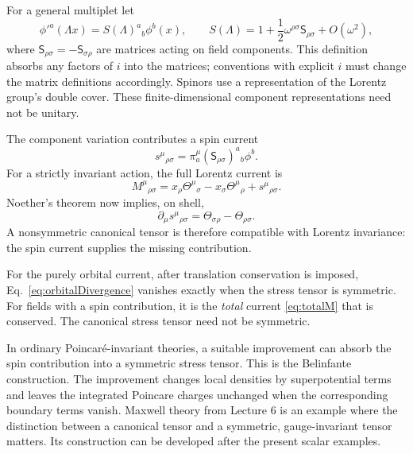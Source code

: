 \documentclass[11pt]{article}
\newcommand{\Th}{\Theta}
\begin{document}
For a general multiplet let
\begin{equation}
\phi'^a(\Lambda x)=S(\Lambda)^a{}_b\phi^b(x),\qquad
S(\Lambda)=1+\frac12\omega^{\rho\sigma}\mathsf S_{\rho\sigma}
+O(\omega^2),
\label{eq:LorentzRepresentation}
\end{equation}
where \(\mathsf S_{\rho\sigma}=-\mathsf S_{\sigma\rho}\) are matrices
acting on field components. This definition absorbs any factors of \(i\)
into the matrices; conventions with explicit \(i\) must change the
matrix definitions accordingly. Spinors use a representation of the
Lorentz group's double cover. These finite-dimensional component
representations need not be unitary.

The component variation contributes a spin current
\begin{equation}
s^\mu{}_{\rho\sigma}
=\pi_a^\mu(\mathsf S_{\rho\sigma})^a{}_b\phi^b.
\end{equation}
For a strictly invariant action, the full Lorentz current is
\begin{equation}
\boxed{M^\mu{}_{\rho\sigma}
=x_\rho\Th^\mu{}_{\sigma}-x_\sigma\Th^\mu{}_{\rho}
+s^\mu{}_{\rho\sigma}.}
\label{eq:totalM}
\end{equation}
Noether's theorem now implies, on shell,
\begin{equation}
\partial_\mu s^\mu{}_{\rho\sigma}
=\Th_{\sigma\rho}-\Th_{\rho\sigma}.
\label{eq:spinIdentity}
\end{equation}
A nonsymmetric canonical tensor is therefore compatible with Lorentz
invariance: the spin current supplies the missing contribution.

\begin{warningbox}
For the purely orbital current, after translation conservation is imposed,
Eq.~\eqref{eq:orbitalDivergence} vanishes exactly when the stress tensor is
symmetric. For fields with a spin contribution, it is the \emph{total}
current \eqref{eq:totalM} that is conserved. The canonical stress tensor
need not be symmetric.
\end{warningbox}

In ordinary Poincaré-invariant theories, a suitable improvement can absorb
the spin contribution into a symmetric stress tensor. This is the
Belinfante construction. The improvement changes local densities by
superpotential terms and leaves the integrated Poincare charges unchanged
when the corresponding boundary terms vanish. Maxwell theory from Lecture
6 is an example where the distinction between a canonical tensor and a
symmetric, gauge-invariant tensor matters. Its construction can be developed
after the present scalar examples.
\end{document}
